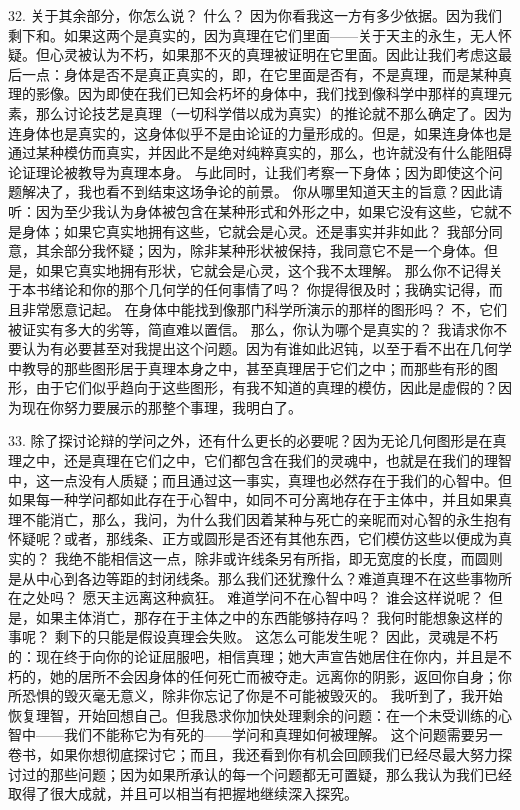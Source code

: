 32.  关于其余部分，你怎么说？ 什么？ 因为你看我这一方有多少依据。因为我们剩下和。如果这两个是真实的，因为真理在它们里面——关于天主的永生，无人怀疑。但心灵被认为不朽，如果那不灭的真理被证明在它里面。因此让我们考虑这最后一点：身体是否不是真正真实的，即，在它里面是否有，不是真理，而是某种真理的影像。因为即使在我们已知会朽坏的身体中，我们找到像科学中那样的真理元素，那么讨论技艺是真理（一切科学借以成为真实）的推论就不那么确定了。因为连身体也是真实的，这身体似乎不是由论证的力量形成的。但是，如果连身体也是通过某种模仿而真实，并因此不是绝对纯粹真实的，那么，也许就没有什么能阻碍论证理论被教导为真理本身。 与此同时，让我们考察一下身体；因为即使这个问题解决了，我也看不到结束这场争论的前景。 你从哪里知道天主的旨意？因此请听：因为至少我认为身体被包含在某种形式和外形之中，如果它没有这些，它就不是身体；如果它真实地拥有这些，它就会是心灵。还是事实并非如此？ 我部分同意，其余部分我怀疑；因为，除非某种形状被保持，我同意它不是一个身体。但是，如果它真实地拥有形状，它就会是心灵，这个我不太理解。 那么你不记得关于本书绪论和你的那个几何学的任何事情了吗？ 你提得很及时；我确实记得，而且非常愿意记起。 在身体中能找到像那门科学所演示的那样的图形吗？ 不，它们被证实有多大的劣等，简直难以置信。 那么，你认为哪个是真实的？ 我请求你不要认为有必要甚至对我提出这个问题。因为有谁如此迟钝，以至于看不出在几何学中教导的那些图形居于真理本身之中，甚至真理居于它们之中；而那些有形的图形，由于它们似乎趋向于这些图形，有我不知道的真理的模仿，因此是虚假的？因为现在你努力要展示的那整个事理，我明白了。\par

33.  除了探讨论辩的学问之外，还有什么更长的必要呢？因为无论几何图形是在真理之中，还是真理在它们之中，它们都包含在我们的灵魂中，也就是在我们的理智中，这一点没有人质疑；而且通过这一事实，真理也必然存在于我们的心智中。但如果每一种学问都如此存在于心智中，如同不可分离地存在于主体中，并且如果真理不能消亡，那么，我问，为什么我们因着某种与死亡的亲昵而对心智的永生抱有怀疑呢？或者，那线条、正方或圆形是否还有其他东西，它们模仿这些以便成为真实的？ 我绝不能相信这一点，除非或许线条另有所指，即无宽度的长度，而圆则是从中心到各边等距的封闭线条。那么我们还犹豫什么？难道真理不在这些事物所在之处吗？ 愿天主远离这种疯狂。 难道学问不在心智中吗？ 谁会这样说呢？ 但是，如果主体消亡，那存在于主体之中的东西能够持存吗？ 我何时能想象这样的事呢？ 剩下的只能是假设真理会失败。 这怎么可能发生呢？ 因此，灵魂是不朽的：现在终于向你的论证屈服吧，相信真理；她大声宣告她居住在你内，并且是不朽的，她的居所不会因身体的任何死亡而被夺走。远离你的阴影，返回你自身；你所恐惧的毁灭毫无意义，除非你忘记了你是不可能被毁灭的。 我听到了，我开始恢复理智，开始回想自己。但我恳求你加快处理剩余的问题：在一个未受训练的心智中——我们不能称它为有死的——学问和真理如何被理解。 这个问题需要另一卷书，如果你想彻底探讨它；而且，我还看到你有机会回顾我们已经尽最大努力探讨过的那些问题；因为如果所承认的每一个问题都无可置疑，那么我认为我们已经取得了很大成就，并且可以相当有把握地继续深入探究。\par

